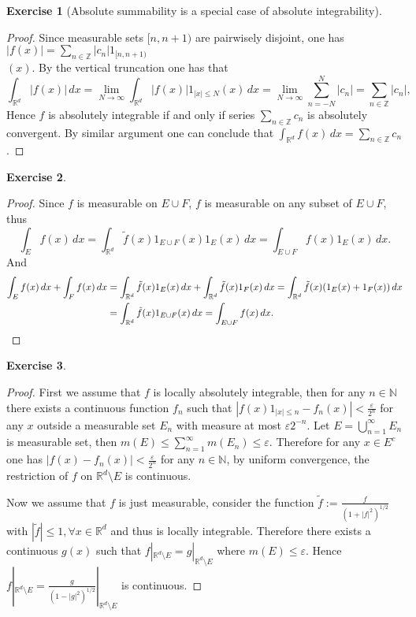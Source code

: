 \documentclass[a4paper]{article}
\newtheorem{ex}{Exercise}[subsection]
\begin{document}
\setcounter{ex}{20}
\begin{ex}[Absolute summability is a special case of absolute integrability]\end{ex}
\begin{proof}
Since measurable sets $[n, n + 1)$ are pairwisely disjoint, one has $|f(x)| = \sum_{n \in \mathbb{Z}} |c_n|1_{[n, n + 1)}$\\$(x)$.
By the vertical truncation one has that $$
\int_{\mathbb{R}^d} |f(x)|\,dx = \lim_{N \to \infty} \int_{\mathbb{R}^d} |f(x)|1_{|x| \leq N}(x)\,dx 
= \lim_{N \to \infty} \sum_{n = -N}^N |c_n| = \sum_{n \in \mathbb{Z}}|c_n|,
$$Hence $f$ is absolutely integrable if and only if series $\sum_{n \in \mathbb{Z}}c_n$ is absolutely convergent.
By similar argument one can conclude that $\int_{\mathbb{R}^d} f(x)\,dx = \sum_{n \in \mathbb{Z}} c_n$.
\end{proof}

\begin{ex}\end{ex}\begin{proof}
Since $f$ is measurable on $E \cup F$, $f$ is measurable on any subset of $E \cup F$, thus $$
\int_{E} f(x)\,dx = \int_{\mathbb{R}^d} \tilde{f}(x)1_{E \cup F}(x)1_E(x)\,dx = \int_{E \cup F} f(x)1_E(x)\,dx.
$$And \begin{align*}
\int_E f(x)\,dx + \int_F f(x)\,dx &= \int_{\mathbb{R}^d} \tilde{f}(x)1_E(x)\,dx + \int_{\mathbb{R}^d} \tilde{f}(x)1_F(x)\,dx 
= \int_{\mathbb{R}^d} \tilde{f}(x)(1_E(x) + 1_F(x))\,dx\\
&=\int_{\mathbb{R}^d} \tilde{f}(x)1_{E \cup F}(x)\,dx = \int_{E \cup F} f(x)\,dx.\qedhere
\end{align*}
\end{proof}

\begin{ex}\end{ex}\begin{proof}
First we assume that $f$ is locally absolutely integrable, then for any $n \in \mathbb{N}$ there exists a continuous 
function $f_n$ such that $|f(x)1_{|x| \leq n} - f_n(x)| < \frac{\varepsilon}{2^n}$ for any $x$ outside a measurable 
set $E_n$ with measure at most $\varepsilon 2^{-n}$. Let $E = \bigcup_{n = 1}^\infty E_n$ is measurable set, then 
$m(E) \leq \sum_{n = 1}^\infty m(E_n) \leq \varepsilon$. Therefore for any $x \in E^c$ one has $|f(x) - f_n(x)| < \frac{\varepsilon}{2^n}$
for any $n \in \mathbb{N}$, by uniform convergence, the restriction of $f$ on $\mathbb{R}^d \setminus E$ is continuous.

Now we assume that $f$ is just measurable, consider the function $\tilde{f} := \frac{f}{(1 + |f|^2)^{1/2}}$ with
$|\tilde{f}| \leq 1, \forall x \in \mathbb{R}^d$ and thus is locally integrable. Therefore there exists a continuous
$g(x)$ such that $f|_{\mathbb{R}^d \setminus E} = g|_{\mathbb{R}^d \setminus E}$ where $m(E) \leq \varepsilon$.
Hence $f|_{\mathbb{R}^d \setminus E} = \frac{g}{(1 - |g|^2)^{1/2}}|_{\mathbb{R}^d \setminus E}$ is continuous.
\end{proof}
\end{document}
